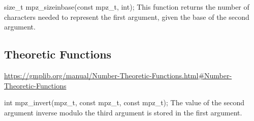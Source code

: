 size\_t mpz\_sizeinbase(const mpz\_t, int);\break
This function returns the number of characters needed to
represent the first argument, given the base of the second
argument.

\subsection{Theoretic Functions}

\url{https://gmplib.org/manual/Number-Theoretic-Functions.html#Number-Theoretic-Functions}

int mpz\_invert(mpz\_t, const mpz\_t, const mpz\_t);\break
The value of the second argument inverse modulo the third
argument is stored in the first argument.
